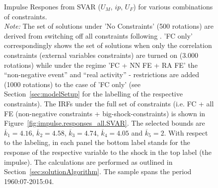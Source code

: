 \documentclass[a4paper,11pt,listof=nochaptergap,oneside,pointednumbers,bibtotoc,bigheadings,liststotoc,hidelinks]{scrbook}
\theoremstyle{mysatz}
\theoremstyle{mydefinition}
\theoremstyle{mytheorem}
\theoremstyle{mybemerkung}
\begin{document}
\begin{figure}[!h]
   \centering
   \setlength\fboxsep{0pt}
   \setlength\fboxrule{0pt}
      \caption[Impulse Respones from SVAR ($U_{M}$, $ip$, $U_{F}$) for various combinations of constraints.]{Impulse Respones from SVAR ($U_{M}$, $ip$, $U_{F}$) for various combinations of constraints.\\
      \textit{Note:} The set of solutions under 'No Constraints' (500 rotations) are derived from switching off all constraints following  \citet{ludvigsonetal:19}. 'FC only' correspondingly shows the set of solutions when only the correlation constraints (external variables constraints) are turned on (3.000 rotations) while under the regime 'FC + NN FE + RA FE' the ``non-negative event'' and ``real activity'' - restrictions are added (1000 rotations) to the case of 'FC only' (see Section~\ref{sec:modelSetup} for the labelling of the respective constraints). The IRFs under the full set of constraints (i.e. FC + all FE (non-negative constraints + big-shock-constraints) is shown in Figure~\ref{fig:impulse.responses_all.SVAR}. The selected bounds are $\overline{k}_1 = 4.16$, $\overline{k}_2 = 4.58$, $\overline{k}_3 = 4.74$, $\overline{k}_4 = 4.05$ and $\overline{k}_5 = 2$. With respect to the labeling, in each panel the bottom label stands for the response of the respective variable to the shock in the top label (the impulse). The calculations are performed as outlined in Section~\ref{sec:solutionAlgorithm}. The sample spans the period 1960:07-2015:04.}   \label{fig:impulse.responses_all.SVAR_UNCONSTR}
\end{figure}
\end{document}
